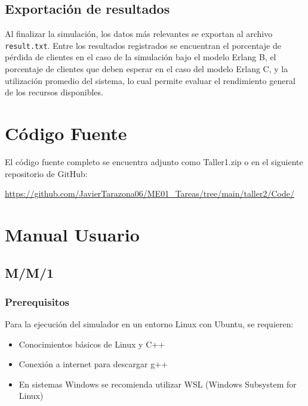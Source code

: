\documentclass{article}
\begin{document}
\subsection{Exportación de resultados}

Al finalizar la simulación, los datos más relevantes se exportan al archivo \texttt{result.txt}. Entre los resultados registrados se encuentran el porcentaje de pérdida de clientes en el caso de la simulación bajo el modelo Erlang B, el porcentaje de clientes que deben esperar en el caso del modelo Erlang C, y la utilización promedio del sistema, lo cual permite evaluar el rendimiento general de los recursos disponibles.



\section{Código Fuente}\label{sec:cod}

El código fuente completo se encuentra adjunto como Taller1.zip
o en el siguiente repositorio de GitHub:

\begin{center}
\url{https://github.com/JavierTarazona06/ME01_Tareas/tree/main/taller2/Code/}
\end{center}



\section{Manual Usuario}\label{sec:man_u}

\subsection{M/M/1}\label{subsec:mm1_usuario}

\subsubsection{Prerequisitos}
Para la ejecución del simulador en un entorno Linux con Ubuntu, se requieren:
\begin{itemize}
    \item Conocimientos básicos de Linux y C++
    \item Conexión a internet para descargar g++
    \item En sistemas Windows se recomienda utilizar WSL (Windows Subsystem for Linux)
\end{itemize}
\end{document}
